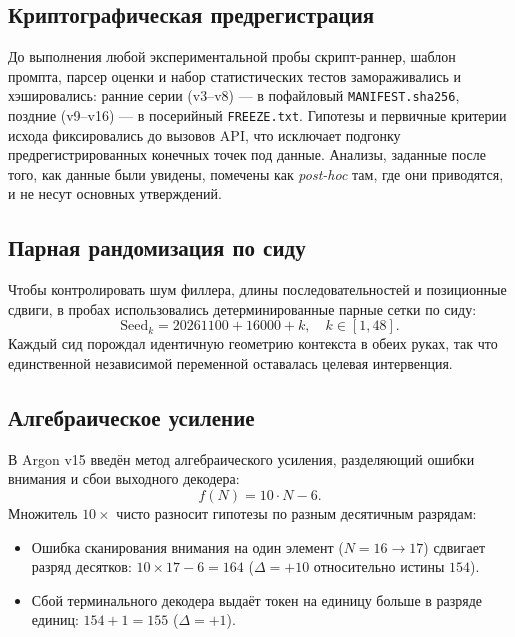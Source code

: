 \documentclass[11pt,a4paper]{article}
\begin{document}
\subsection{Криптографическая предрегистрация}
До выполнения любой экспериментальной пробы скрипт-раннер, шаблон промпта, парсер оценки и набор статистических тестов замораживались и хэшировались: ранние серии (v3--v8) — в пофайловый \texttt{MANIFEST.sha256}, поздние (v9--v16) — в посерийный \texttt{FREEZE.txt}. Гипотезы и первичные критерии исхода фиксировались до вызовов API, что исключает подгонку предрегистрированных конечных точек под данные. Анализы, заданные после того, как данные были увидены, помечены как \emph{post-hoc} там, где они приводятся, и не несут основных утверждений.

\subsection{Парная рандомизация по сиду}
Чтобы контролировать шум филлера, длины последовательностей и позиционные сдвиги, в пробах использовались детерминированные парные сетки по сиду:
\begin{equation}
    \text{Seed}_k = 20261100 + 16000 + k, \quad k \in [1, 48].
\end{equation}
Каждый сид порождал идентичную геометрию контекста в обеих руках, так что единственной независимой переменной оставалась целевая интервенция.

\subsection{Алгебраическое усиление}
В Argon v15 введён метод алгебраического усиления, разделяющий ошибки внимания и сбои выходного декодера:
\begin{equation}
    f(N) = 10 \cdot N - 6.
\end{equation}
Множитель $10\times$ чисто разносит гипотезы по разным десятичным разрядам:
\begin{itemize}
    \item Ошибка сканирования внимания на один элемент ($N=16 \to 17$) сдвигает разряд десятков: $10 \times 17 - 6 = 164$ ($\Delta = +10$ относительно истины $154$).
    \item Сбой терминального декодера выдаёт токен на единицу больше в разряде единиц: $154 + 1 = 155$ ($\Delta = +1$).
\end{itemize}
\end{document}
